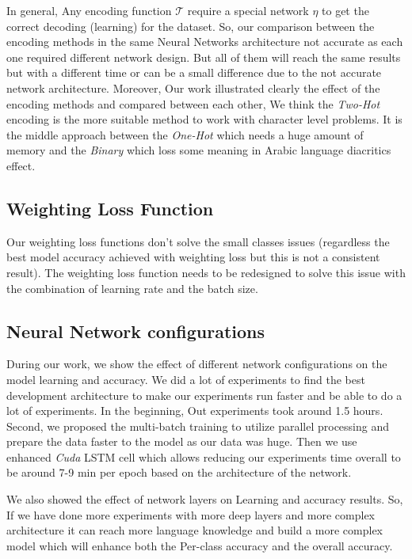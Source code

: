 In general, Any encoding function $\mathcal{T}$ require a special network $\eta$ to get the correct decoding (learning) for the dataset. So, our comparison between the encoding methods in the same Neural Networks architecture not accurate as each one required different network design. But all of them will reach the same results but with a different time or can be a small difference due to the not accurate network architecture. Moreover, Our work illustrated clearly the effect of the encoding methods and compared between each other, We think the \textit{Two-Hot} encoding is the more suitable method to work with character level problems. It is the middle approach between the \textit{One-Hot} which needs a huge amount of memory and the \textit{Binary} which loss some meaning in Arabic language diacritics effect.


\subsection{Weighting Loss Function}
Our weighting loss functions don’t solve the small classes issues (regardless the best model accuracy achieved with weighting loss but this is not a consistent result). The weighting loss function needs to be redesigned to solve this issue with the combination of learning rate and the batch size.

\subsection{Neural Network configurations}

During our work, we show the effect of different network configurations on the model learning and accuracy. We did a lot of experiments to find the best development architecture to make our experiments run faster and be able to do a lot of experiments. In the beginning, Out experiments took around 1.5 hours. Second, we proposed the multi-batch training to utilize parallel processing and prepare the data faster to the model as our data was huge. Then we use enhanced \textit{Cuda} LSTM cell which allows reducing our experiments time overall to be around 7-9 min per epoch based on the architecture of the network.

We also showed the effect of network layers on Learning and accuracy results. So, If we have done more experiments with more deep layers and more complex architecture it can reach more language knowledge and build a more complex model which will enhance both the Per-class accuracy and the overall accuracy.
